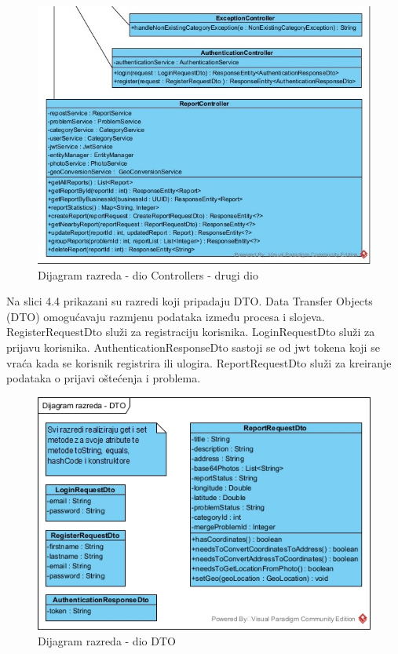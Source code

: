 \begin{figure}[H]
	\includegraphics[scale=1.0]{slike/DR-controller2} %
	\centering
	\caption{Dijagram razreda - dio Controllers - drugi dio}
	\label{fig:DijagramRazredaControllers}
\end{figure}

Na slici 4.4 prikazani su razredi koji pripadaju DTO. Data Transfer Objects (DTO) omogućavaju
razmjenu podataka između procesa i slojeva. RegisterRequestDto služi za registraciju korisnika.
LoginRequestDto služi za prijavu korisnika. AuthenticationResponseDto sastoji se od jwt tokena koji se vraća
kada se korisnik registrira ili ulogira. ReportRequestDto služi za kreiranje podataka o prijavi
oštećenja i problema.

\begin{figure}[H]
	\includegraphics[scale=0.60]{slike/DR-DTO.jpg} %
	\centering
	\caption{Dijagram razreda - dio DTO}
	\label{fig:DijagramRazredaDTO}
\end{figure}

